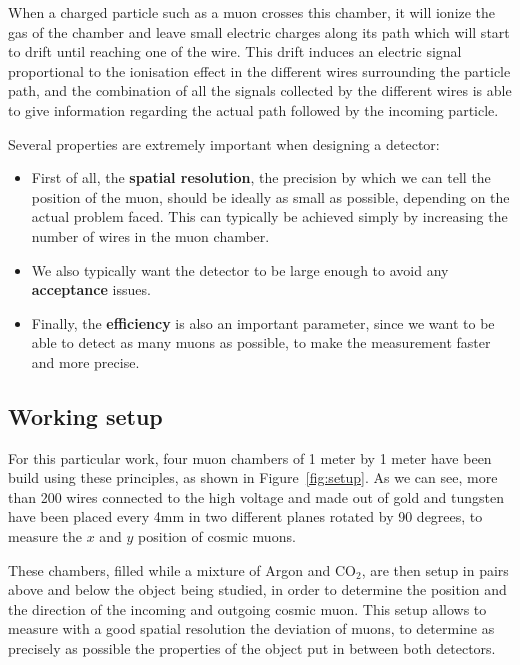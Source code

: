 \documentclass[a4paper, 11pt]{report}
\begin{document}
When a charged particle such as a muon crosses this chamber, it will ionize the gas of the chamber and leave small electric charges along its path which will start to drift until reaching one of the wire. This drift induces an electric signal proportional to the ionisation effect in the different wires surrounding the particle path, and the combination of all the signals collected by the different wires is able to give information regarding the actual path followed by the incoming particle.	

Several properties are extremely important when designing a detector:
\begin{itemize}
\item First of all, the \textbf{spatial resolution}, the precision by which we can tell the position of the muon, should be ideally as small as possible, depending on the actual problem faced. This can typically be achieved simply by increasing the number of wires in the muon chamber.
\item We also typically want the detector to be large enough to avoid any \textbf{acceptance} issues.
\item Finally, the \textbf{efficiency} is also an important parameter, since we want to be able to detect as many muons as possible, to make the measurement faster and more precise.
\end{itemize}

\subsection{Working setup} \label{sec:ourSetup}

For this particular work, four muon chambers of 1 meter by 1 meter have been build using these principles, as shown in Figure~\ref{fig:setup}. As we can see, more than 200 wires connected to the high voltage and made out of gold and tungsten have been placed every 4mm in two different planes rotated by 90 degrees, to measure the $x$ and $y$ position of cosmic muons. 

These chambers, filled while a mixture of Argon and CO$_2$, are then setup in pairs above and below the object being studied, in order to determine the position and the direction of the incoming and outgoing cosmic muon. This setup allows to measure with a good spatial resolution the deviation of muons, to determine as precisely as possible the properties of the object put in between both detectors.
\end{document}
